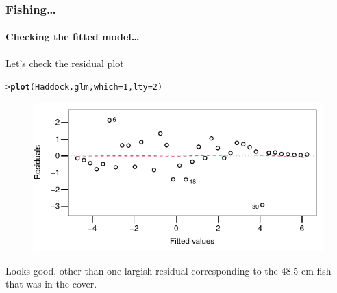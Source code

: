\documentclass{beamer}\usepackage[]{graphicx}\usepackage[]{xcolor}
\makeatletter
\newcommand{\hlnum}[1]{\textcolor[rgb]{0.686,0.059,0.569}{#1}}%
\newcommand{\hlstd}[1]{\textcolor[rgb]{0.345,0.345,0.345}{#1}}%
\newcommand{\hlkwc}[1]{\textcolor[rgb]{0.333,0.667,0.333}{#1}}%
\newcommand{\hlkwd}[1]{\textcolor[rgb]{0.737,0.353,0.396}{\textbf{#1}}}%
\newenvironment{kframe}{%
 \def\at@end@of@kframe{}%
 \ifinner\ifhmode%
  \def\at@end@of@kframe{\end{minipage}}%
  \begin{minipage}{\columnwidth}%
 \fi\fi%
 \def\FrameCommand##1{\hskip\@totalleftmargin \hskip-\fboxsep
 \colorbox{shadecolor}{##1}\hskip-\fboxsep
     \hskip-\linewidth \hskip-\@totalleftmargin \hskip\columnwidth}%
 \MakeFramed {\advance\hsize-\width
   \@totalleftmargin\z@ \linewidth\hsize
   \@setminipage}}%
 {\par\unskip\endMakeFramed%
 \at@end@of@kframe}
\newenvironment{knitrout}{}{} %
\makeatother
\begin{document}
\begin{frame}[fragile]
\frametitle{Fishing\ldots}
\framesubtitle{Checking the fitted model\ldots}
Let's check the residual plot
\begin{knitrout}\scriptsize
{}\color{fgcolor}\begin{kframe}
\begin{alltt}
\hlstd{> }\hlkwd{plot}\hlstd{(Haddock.glm,}\hlkwc{which}\hlstd{=}\hlnum{1}\hlstd{,} \hlkwc{lty}\hlstd{=}\hlnum{2}\hlstd{)}
\end{alltt}
\end{kframe}
\end{knitrout}

\begin{figure}
  \centering
  \includegraphics{figure/RC-H15-041}
\end{figure}

Looks good, other than one largish residual corresponding to the 48.5 cm fish that was in the cover.
\end{frame}
\end{document}
